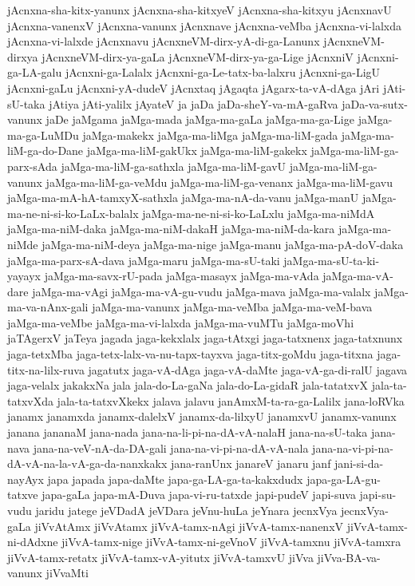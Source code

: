 {jAcnxna-sha-kitx-yanunx
jAcnxna-sha-kitxyeV
jAcnxna-sha-kitxyu
jAcnxnavU
jAcnxna-vanenxV
jAcnxna-vanunx
jAcnxnave
jAcnxna-veMba
jAcnxna-vi-lalxda
jAcnxna-vi-lalxde
jAcnxnavu
jAcnxneVM-dirx-yA-di-ga-Lanunx
jAcnxneVM-dirxya
jAcnxneVM-dirx-ya-gaLa
jAcnxneVM-dirx-ya-ga-Lige
jAcnxniV
jAcnxni-ga-LA-galu
jAcnxni-ga-Lalalx
jAcnxni-ga-Le-tatx-ba-lalxru
jAcnxni-ga-LigU
jAcnxni-gaLu
jAcnxni-yA-dudeV
jAcnxtaq
jAgaqta
jAgarx-ta-vA-dAga
jAri
jAti-sU-taka
jAtiya
jAti-yalilx
jAyateV
ja
jaDa
jaDa-sheY-va-mA-gaRva
jaDa-va-sutx-vanunx
jaDe
jaMgama
jaMga-mada
jaMga-ma-gaLa
jaMga-ma-ga-Lige
jaMga-ma-ga-LuMDu
jaMga-makekx
jaMga-ma-liMga
jaMga-ma-liM-gada
jaMga-ma-liM-ga-do-Dane
jaMga-ma-liM-gakUkx
jaMga-ma-liM-gakekx
jaMga-ma-liM-ga-parx-sAda
jaMga-ma-liM-ga-sathxla
jaMga-ma-liM-gavU
jaMga-ma-liM-ga-vanunx
jaMga-ma-liM-ga-veMdu
jaMga-ma-liM-ga-venanx
jaMga-ma-liM-gavu
jaMga-ma-mA-hA-tamxyX-sathxla
jaMga-ma-nA-da-vanu
jaMga-manU
jaMga-ma-ne-ni-si-ko-LaLx-balalx
jaMga-ma-ne-ni-si-ko-LaLxlu
jaMga-ma-niMdA
jaMga-ma-niM-daka
jaMga-ma-niM-dakaH
jaMga-ma-niM-da-kara
jaMga-ma-niMde
jaMga-ma-niM-deya
jaMga-ma-nige
jaMga-manu
jaMga-ma-pA-doV-daka
jaMga-ma-parx-sA-dava
jaMga-maru
jaMga-ma-sU-taki
jaMga-ma-sU-ta-ki-yayayx
jaMga-ma-savx-rU-pada
jaMga-masayx
jaMga-ma-vAda
jaMga-ma-vA-dare
jaMga-ma-vAgi
jaMga-ma-vA-gu-vudu
jaMga-mava
jaMga-ma-valalx
jaMga-ma-va-nAnx-gali
jaMga-ma-vanunx
jaMga-ma-veMba
jaMga-ma-veM-bava
jaMga-ma-veMbe
jaMga-ma-vi-lalxda
jaMga-ma-vuMTu
jaMga-moVhi
jaTAgerxV
jaTeya
jagada
jaga-kekxlalx
jaga-tAtxgi
jaga-tatxnenx
jaga-tatxnunx
jaga-tetxMba
jaga-tetx-lalx-va-nu-tapx-tayxva
jaga-titx-goMdu
jaga-titxna
jaga-titx-na-lilx-ruva
jagatutx
jaga-vA-dAga
jaga-vA-daMte
jaga-vA-ga-di-ralU
jagava
jaga-velalx
jakakxNa
jala
jala-do-La-gaNa
jala-do-La-gidaR
jala-tatatxvX
jala-ta-tatxvXda
jala-ta-tatxvXkekx
jalava
jalavu
janAmxM-ta-ra-ga-Lalilx
jana-loRVka
janamx
janamxda
janamx-dalelxV
janamx-da-lilxyU
janamxvU
janamx-vanunx
janana
jananaM
jana-nada
jana-na-li-pi-na-dA-vA-nalaH
jana-na-sU-taka
jana-nava
jana-na-veV-nA-da-DA-gali
jana-na-vi-pi-na-dA-vA-nala
jana-na-vi-pi-na-dA-vA-na-la-vA-ga-da-nanxkakx
jana-ranUnx
janareV
janaru
janf
jani-si-da-nayAyx
japa
japada
japa-daMte
japa-ga-LA-ga-ta-kakxdudx
japa-ga-LA-gu-tatxve
japa-gaLa
japa-mA-Duva
japa-vi-ru-tatxde
japi-pudeV
japi-suva
japi-su-vudu
jaridu
jatege
jeVDadA
jeVDara
jeVnu-huLa
jeYnara
jecnxVya
jecnxVya-gaLa
jiVvAtAmx
jiVvAtamx
jiVvA-tamx-nAgi
jiVvA-tamx-nanenxV
jiVvA-tamx-ni-dAdxne
jiVvA-tamx-nige
jiVvA-tamx-ni-geVnoV
jiVvA-tamxnu
jiVvA-tamxra
jiVvA-tamx-retatx
jiVvA-tamx-vA-yitutx
jiVvA-tamxvU
jiVva
jiVva-BA-va-vanunx
jiVvaMti
}

